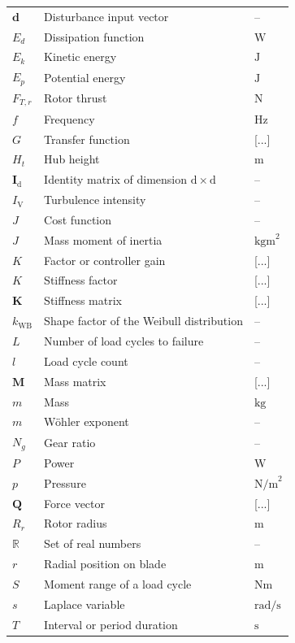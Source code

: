 \begin{longtable}{lll}
    $\bm{d}$ & Disturbance input vector & --  \\
    $E_d$ & Dissipation function & $\mathrm{W}$\\
    $E_k$ & Kinetic energy & $\mathrm{J}$\\
    $E_p$ & Potential energy & $\mathrm{J}$\\
    $F_{T,r}$ & Rotor thrust & $\mathrm{N}$ \\
    $f$ & Frequency & $\mathrm{Hz}$ \\
    $G$ & Transfer function & [...] \\
    $H_t$ & Hub height & $\mathrm{m}$ \\
    $\bm{I}_\mathrm{d}$ & Identity matrix of dimension $\mathrm{d}\times {\mathrm{d}}$& -- \\
    $I_\mathrm{V}$ & Turbulence intensity & -- \\
    $J$ & Cost function & -- \\
    $J$ & Mass moment of inertia & $\mathrm{kgm}^2$ \\
    $K$ & Factor or controller gain & [...] \\
    $K$ & Stiffness factor & [...] \\
    $\mathbf{K}$ & Stiffness matrix & [...] \\
    $k_{\text{WB}}$ & Shape factor of the Weibull distribution & -- \\
    $L$ & Number of load cycles to failure & -- \\
    $l$ & Load cycle count & -- \\
    $\mathbf{M}$ & Mass matrix & [...] \\  
    $m$ & Mass & $\mathrm{kg}$ \\
    $m$ & Wöhler exponent & -- \\
    $N_g$ & Gear ratio & -- \\
    $P$ & Power & $\mathrm{W}$ \\
    $p$ & Pressure &  $\mathrm{N/m}^2$ \\
    $\mathbf{Q}$  & Force vector & [...] \\
    $R_r$ & Rotor radius & $\mathrm{m}$ \\
    $\mathbb{R}$ & Set of real numbers & -- \\
    $r$ & Radial position on blade & $\mathrm{m}$ \\
    $S$ & Moment range of a load cycle & $\mathrm{Nm}$ \\
    $s$ & Laplace variable & $\mathrm{rad/s}$ \\
    $T$ & Interval or period duration & $\mathrm{s}$ \\

\end{longtable}
